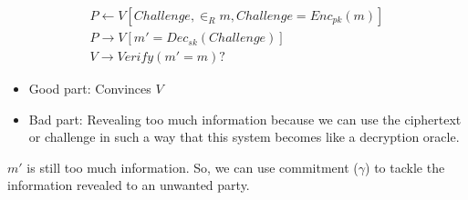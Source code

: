 \documentclass{article}
\begin{document}
\begin{align*}
    P \leftarrow V [Challenge, \in_{R} m, Challenge = Enc_{pk}(m)] \\
    P \rightarrow V [m' = Dec_{sk}(Challenge)] \\
    V \rightarrow Verify(m' = m)?
\end{align*}

\begin{itemize}
    \item Good part: Convinces $V$
    \item Bad part: Revealing too much information because we can use the ciphertext or challenge in such a way that this system becomes like a decryption oracle.
\end{itemize}

$m'$ is still too much information. So, we can use commitment ($\gamma$) to tackle the information revealed to an unwanted party.
\end{document}
